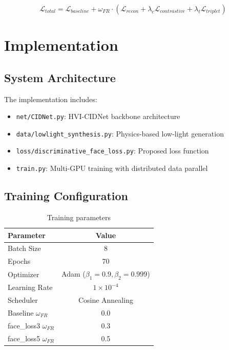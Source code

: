 \documentclass[12pt,a4paper]{article}
\begin{document}
\begin{equation}
\mathcal{L}_{total} = \mathcal{L}_{baseline} + \omega_{FR} \cdot (\mathcal{L}_{recon} + \lambda_c \mathcal{L}_{contrastive} + \lambda_t \mathcal{L}_{triplet})
\end{equation}

\section{Implementation}

\subsection{System Architecture}

The implementation includes:
\begin{itemize}
    \item \texttt{net/CIDNet.py}: HVI-CIDNet backbone architecture
    \item \texttt{data/lowlight\_synthesis.py}: Physics-based low-light generation
    \item \texttt{loss/discriminative\_face\_loss.py}: Proposed loss function
    \item \texttt{train.py}: Multi-GPU training with distributed data parallel
\end{itemize}

\subsection{Training Configuration}

\begin{table}[H]
\centering
\caption{Training parameters}
\label{tab:training}
\begin{tabular}{lc}
\toprule
Parameter & Value \\
\midrule
Batch Size & 8 \\
Epochs & 70 \\
Optimizer & Adam ($\beta_1=0.9, \beta_2=0.999$) \\
Learning Rate & $1 \times 10^{-4}$ \\
Scheduler & Cosine Annealing \\
Baseline $\omega_{FR}$ & 0.0 \\
face\_loss3 $\omega_{FR}$ & 0.3 \\
face\_loss5 $\omega_{FR}$ & 0.5 \\
\bottomrule
\end{tabular}
\end{table}
\end{document}
